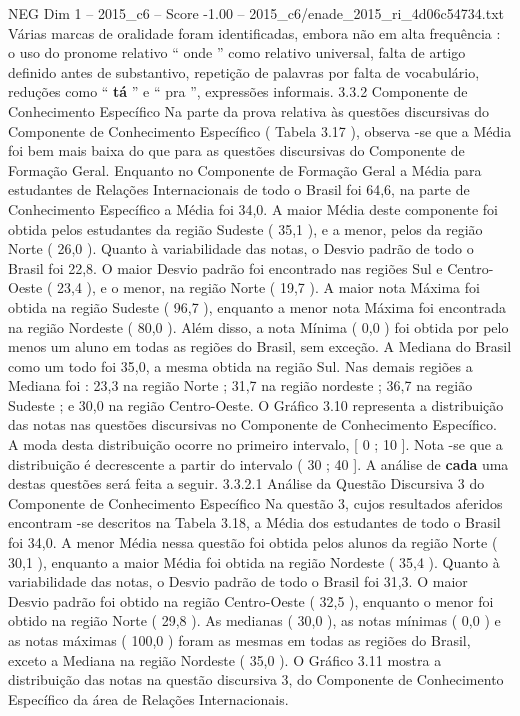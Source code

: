 \begin{textsample}{NEG Dim 1 – 2015\_c6 – Score -1.00 – 2015\_c6/enade\_2015\_ri\_4d06c54734.txt}
Várias marcas de oralidade foram identificadas, embora não em alta frequência : o uso do pronome relativo “ onde ” como relativo universal, falta de artigo definido antes de substantivo, repetição de palavras por falta de vocabulário, reduções como “ \textbf{tá} ” e “ pra ”, expressões informais. 3.3.2 Componente de Conhecimento Específico Na parte da prova relativa às questões discursivas do Componente de Conhecimento Específico ( Tabela 3.17 ), observa -se que a Média foi bem mais baixa do que para as questões discursivas do Componente de Formação Geral.
Enquanto no Componente de Formação Geral a Média para estudantes de Relações Internacionais de todo o Brasil foi 64,6, na parte de Conhecimento Específico a Média foi 34,0.
A maior Média deste componente foi obtida pelos estudantes da região Sudeste ( 35,1 ), e a menor, pelos da região Norte ( 26,0 ).
Quanto à variabilidade das notas, o Desvio padrão de todo o Brasil foi 22,8.
O maior Desvio padrão foi encontrado nas regiões Sul e Centro-Oeste ( 23,4 ), e o menor, na região Norte ( 19,7 ).
A maior nota Máxima foi obtida na região Sudeste ( 96,7 ), enquanto a menor nota Máxima foi encontrada na região Nordeste ( 80,0 ).
Além disso, a nota Mínima ( 0,0 ) foi obtida por pelo menos um aluno em todas as regiões do Brasil, sem exceção.
A Mediana do Brasil como um todo foi 35,0, a mesma obtida na região Sul.
Nas demais regiões a Mediana foi : 23,3 na região Norte ; 31,7 na região nordeste ; 36,7 na região Sudeste ; e 30,0 na região Centro-Oeste.
O Gráfico 3.10 representa a distribuição das notas nas questões discursivas no Componente de Conhecimento Específico.
A moda desta distribuição ocorre no primeiro intervalo, [ 0 ; 10 ].
Nota -se que a distribuição é decrescente a partir do intervalo ( 30 ; 40 ].
A análise de \textbf{cada} uma destas questões será feita a seguir. 3.3.2.1 Análise da Questão Discursiva 3 do Componente de Conhecimento Específico Na questão 3, cujos resultados aferidos encontram -se descritos na Tabela 3.18, a Média dos estudantes de todo o Brasil foi 34,0.
A menor Média nessa questão foi obtida pelos alunos da região Norte ( 30,1 ), enquanto a maior Média foi obtida na região Nordeste ( 35,4 ).
Quanto à variabilidade das notas, o Desvio padrão de todo o Brasil foi 31,3.
O maior Desvio padrão foi obtido na região Centro-Oeste ( 32,5 ), enquanto o menor foi obtido na região Norte ( 29,8 ).
As medianas ( 30,0 ), as notas mínimas ( 0,0 ) e as notas máximas ( 100,0 ) foram as mesmas em todas as regiões do Brasil, exceto a Mediana na região Nordeste ( 35,0 ).
O Gráfico 3.11 mostra a distribuição das notas na questão discursiva 3, do Componente de Conhecimento Específico da área de Relações Internacionais.

\end{textsample}
